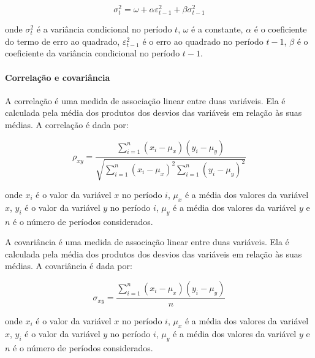                 \begin{equation}
                    \label{eq:GARCH}
                    \sigma_t^2 = \omega + \alpha \varepsilon_{t-1}^2 + \beta \sigma_{t-1}^2
                \end{equation}

                \noindent onde $\sigma_t^2$ é a variância condicional no período $t$, $\omega$ é a constante, $\alpha$ é o coeficiente do termo de erro ao quadrado, $\varepsilon_{t-1}^2$ é o erro ao quadrado no período $t-1$, $\beta$ é o coeficiente da variância condicional no período $t-1$.


            \paragraph{Correlação e covariância}
                
                \ipar A correlação é uma medida de associação linear entre duas variáveis. Ela é calculada pela média dos produtos dos desvios das variáveis em relação às suas médias. A correlação é dada por:

                \begin{equation}
                    \rho_{xy} = \frac{{\sum_{i=1}^{n} (x_i - \mu_x)(y_i - \mu_y)}}{{\sqrt{\sum_{i=1}^{n} (x_i - \mu_x)^2 \sum_{i=1}^{n} (y_i - \mu_y)^2}}}
                \end{equation}

                \noindent onde $x_i$ é o valor da variável $x$ no período $i$, $\mu_x$ é a média dos valores da variável $x$, $y_i$ é o valor da variável $y$ no período $i$, $\mu_y$ é a média dos valores da variável $y$ e $n$ é o número de períodos considerados.

                \ipar A covariância é uma medida de associação linear entre duas variáveis. Ela é calculada pela média dos produtos dos desvios das variáveis em relação às suas médias. A covariância é dada por:

                \begin{equation}
                    \sigma_{xy} = \frac{{\sum_{i=1}^{n} (x_i - \mu_x)(y_i - \mu_y)}}{{n}}
                \end{equation}

                \noindent onde $x_i$ é o valor da variável $x$ no período $i$, $\mu_x$ é a média dos valores da variável $x$, $y_i$ é o valor da variável $y$ no período $i$, $\mu_y$ é a média dos valores da variável $y$ e $n$ é o número de períodos considerados.

